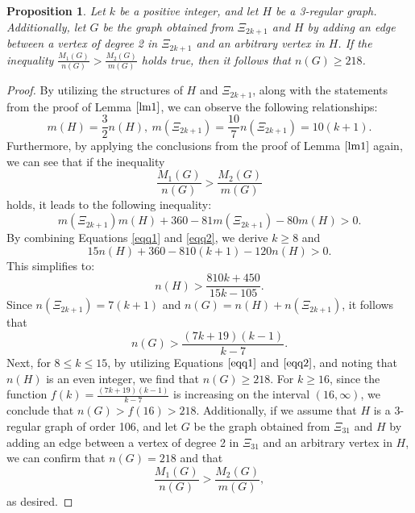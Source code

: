 \documentclass[12pt]{article}
\newtheorem{proposition}[theorem]{Proposition}
\begin{document}
\begin{proposition}\label{pro2}
Let \( k \) be a positive integer, and let \( H \) be a 3-regular graph. Additionally, let \( G \) be the graph obtained from \( \Xi_{2k+1} \) and \( H \) by adding an edge between a vertex of degree 2 in \( \Xi_{2k+1} \) and an arbitrary vertex in \( H \). If the inequality $\frac{M_1(G)}{n(G)} > \frac{M_2(G)}{m(G)}$ holds true, then it follows that \( n(G) \geq 218 \).
\end{proposition}
\begin{proof}
By utilizing the structures of \( H \) and \( \Xi_{2k+1} \), along with the statements from the proof of Lemma \(\ref{lm1}\), we can observe the following relationships:
\begin{equation}\label{eqq1}
m(H)=\frac{3}{2}n(H),~m(\Xi_{2k+1})=\frac{10}{7}n(\Xi_{2k+1})=10(k+1).
\end{equation}
Furthermore, by applying the conclusions from the proof of Lemma \(\ref{lm1}\) again, we can see that if the inequality 
\[
\frac{M_1(G)}{n(G)} > \frac{M_2(G)}{m(G)}
\]
holds, it leads to the following inequality:
\begin{equation}\label{eqq2}
m(\Xi_{2k+1})m(H)+360-81m(\Xi_{2k+1})-80m(H)>0.
\end{equation}
By combining Equations \eqref{eqq1} and \eqref{eqq2}, we derive \( k \geq 8 \) and 
\[
15 n(H) + 360 - 810(k + 1) - 120 n(H) > 0.
\]
This simplifies to:
\[
n(H) > \frac{810k + 450}{15k - 105}.
\]
Since \( n(\Xi_{2k+1}) = 7(k + 1) \) and \( n(G) = n(H) + n(\Xi_{2k+1}) \), it follows that 
\[
n(G) > \frac{(7k + 19)(k - 1)}{k - 7}.
\]
Next, for \( 8 \leq k \leq 15 \), by utilizing Equations \(\eqref{eqq1}\) and \(\eqref{eqq2}\), and noting that \( n(H) \) is an even integer, we find that \( n(G) \geq 218 \). For \( k \geq 16 \), since the function \( f(k) = \frac{(7k + 19)(k - 1)}{k - 7} \) is increasing on the interval \( (16, \infty) \), we conclude that \( n(G) > f(16) > 218 \).
Additionally, if we assume that \( H \) is a 3-regular graph of order 106, and let \( G \) be the graph obtained from \( \Xi_{31} \) and \( H \) by adding an edge between a vertex of degree 2 in \( \Xi_{31} \) and an arbitrary vertex in \( H \), we can confirm that \( n(G) = 218 \) and that 
\[
\frac{M_1(G)}{n(G)} > \frac{M_2(G)}{m(G)},
\]
as desired.

\end{proof}
\end{document}
